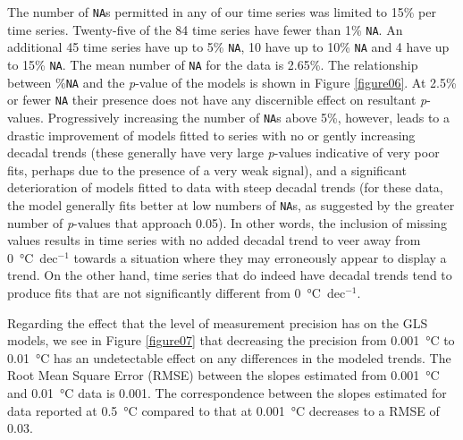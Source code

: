 \documentclass[]{ametsoc}
\begin{document}
The number of \texttt{NA}s permitted in any of our time series was limited to 15\% per time series. Twenty-five of the 84 time series have fewer than 1\% \texttt{NA}. An additional 45 time series have up to 5\% \texttt{NA}, 10 have up to 10\% \texttt{NA} and 4 have up to 15\% \texttt{NA}. The mean number of \texttt{NA} for the data is 2.65\%. The relationship between \%\texttt{NA} and the \emph{p}-value of the models is shown in Figure \ref{figure06}. At 2.5\% or fewer \texttt{NA} their presence does not have any discernible effect on resultant \emph{p}-values. Progressively increasing the number of \texttt{NA}s above 5\%, however, leads to a drastic improvement of models fitted to series with no or gently increasing decadal trends (these generally have very large \emph{p}-values indicative of very poor fits, perhaps due to the presence of a very weak signal), and a significant deterioration of models fitted to data with steep decadal trends (for these data, the model generally fits better at low numbers of \texttt{NA}s, as suggested by the greater number of \emph{p}-values that approach 0.05). In other words, the inclusion of missing values results in time series with no added decadal trend to veer away from \SI{0}{\degreeCelsius}~dec$^{-1}$ towards a situation where they may erroneously appear to display a trend. On the other hand, time series that do indeed have decadal trends tend to produce fits that are not significantly different from \SI{0}{\degreeCelsius}~dec$^{-1}$.

Regarding the effect that the level of measurement precision has on the GLS models, we see in Figure \ref{figure07} that decreasing the precision from \SI{0.001}{\degreeCelsius} to \SI{0.01}{\degreeCelsius} has an undetectable effect on any differences in the modeled trends. The Root Mean Square Error (RMSE) between the slopes estimated from \SI{0.001}{\degreeCelsius} and \SI{0.01}{\degreeCelsius} data is 0.001. The correspondence between the slopes estimated for data reported at \SI{0.5}{\degreeCelsius} compared to that at \SI{0.001}{\degreeCelsius} decreases to a RMSE of 0.03.
\end{document}
